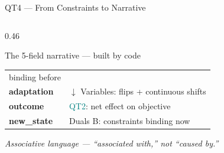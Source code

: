 \documentclass[aspectratio=169,10pt]{beamer}
\begin{document}
\begin{frame}[t]{QT4 — From Constraints to Narrative}
\begin{columns}[T]
\begin{column}{0.46\textwidth}
\begin{block}{The 5-field narrative — built by code}
\begin{tabular}{@{}p{2.3cm}@{\ }p{3.8cm}@{}}
                                    binding before \\
        \textbf{adaptation}       & \textcolor{purp}{$\downarrow$ Variables}:
                                    flips + continuous shifts \\
        \textbf{outcome}          & \textcolor{teal}{QT2}: net effect on
                                    objective \\
        \textbf{new\_state}       & \textcolor{ared}{Duals B}: constraints
                                    binding now \\
        \bottomrule
      \end{tabular}
    \end{block}
    \vspace{4pt}
    \textcolor{mgray}{\scriptsize\textit{Associative language — ``associated
    with,'' not ``caused by.''}}
  \end{column}
\end{columns}
\end{frame}
\end{document}
